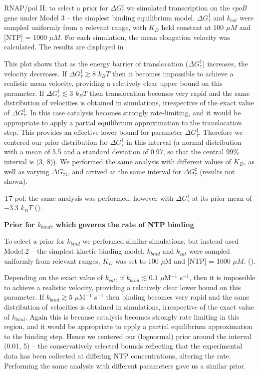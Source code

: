 \documentclass[10pt,letterpaper]{article}
\begin{document}
RNAP/pol II: to select a prior for $\Delta G^\ddag_{\tau}$ we simulated transcription on the \textit{ rpoB} gene under Model 3 -- the simplest binding equilibrium model. $\Delta G^\ddag_{\tau}$ and $k_{cat}$ were sampled uniformly from a relevant range, with $K_D$ held constant at 100 $\mu M$ and [NTP] = 1000 $\mu M$. For each simulation, the mean elongation velocity was calculated. The results are displayed in .


This plot shows that as the energy barrier of translocation ($\Delta G^\ddag_{\tau}$) increases, the velocity decreases. If $\Delta G^\ddag_{\tau} \gtrsim 8$ $k_BT$ then it becomes impossible to achieve a realistic mean velocity, providing a relatively clear upper bound on this parameter. If $\Delta G^\ddag_{\tau} \lesssim 3$ $k_BT$ then translocation becomes very rapid and the same distribution of velocities is obtained in simulations, irrespective of the exact value of $\Delta G^\ddag_{\tau}$. In this case catalysis becomes strongly rate-limiting, and it would be appropriate to apply a partial  equilibrium approximation to the translocation step. This provides an effective lower bound for parameter $\Delta G^\ddag_{\tau}$. Therefore we centered our prior distribution for $\Delta G^\ddag_{\tau}$ in this interval (a normal distribution with a mean of 5.5 and a standard deviation of 0.97, so that the central 99\% interval is (3, 8)).  We performed the same analysis with different values of $K_D$, as well as varying $\Delta G_{\tau 1}$, and arrived at the same interval for $\Delta G^\ddag_{\tau}$ (results not shown).


T7 pol: the same analysis was performed, however with $\Delta G^\ddag_{\tau}$ at its prior mean of $-3.3$ $k_BT$ ().



\textbf{Prior for $k_{bind}$, which governs the rate of NTP binding} \par



To select a prior for  $k_{bind}$ we performed similar simulations, but instead used Model 2 -- the simplest kinetic binding model. $k_{bind}$ and $k_{cat}$ were sampled uniformly from relevant ranges, $K_D$ was set to 100 $\mu$M and [NTP] = 1000 $\mu M$. ().


Depending on the exact value of $k_{cat}$, if $k_{bind} \lesssim 0.1$ $\mu$M$^{-1}$ s$^{-1}$, then it is impossible to achieve a realistic velocity, providing a relatively clear lower bound on this parameter. If $k_{bind} \gtrsim 5$ $\mu$M$^{-1}$ s$^{-1}$ then binding becomes very rapid and the same distribution of velocities is obtained in simulations, irrespective of the exact value of $k_{bind}$. Again this is because catalysis becomes strongly rate limiting in this region, and it would be appropriate to apply a partial  equilibrium approximation to the binding step. Hence we centered our (lognormal) prior around the interval (0.01, 5) -- the conservatively selected bounds reflecting that the experimental data has been collected at differing NTP concentrations, altering the rate. Performing the same analysis with different parameters gave us a similar prior.
\end{document}
